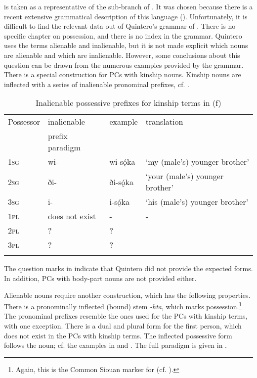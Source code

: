\documentclass[output=paper]{LSP/langsci}
\begin{document}
 is taken as a representative of the  sub-branch of . It was chosen because there is a recent extensive grammatical description of this language (\citealt{Quintero2004}). Unfortunately, it is difficult to find the relevant data out of Quintero's grammar of . There is no specific chapter on possession, and there is no index in the grammar. Quintero uses the terms alienable and inalienable, but it is not made explicit which nouns are alienable and which are inalienable. However, some conclusions about this question can be drawn from the numerous examples provided by the grammar.
There is a special construction for PCs with  kinship nouns. Kinship nouns are inflected with a series of inalienable pronominal prefixes, cf. .

\begin{table}
\caption{Inalienable possessive prefixes for kinship terms in  (\citealt[481]{Quintero2004}f)} \label{osageinalienable}
\begin{tabular}{ l l l l }
\lsptoprule
Possessor	 & inalienable & example & translation \\
& prefix paradigm & & \\
\midrule
\textsc{1sg} & wi-	& wi-sǫ́ka & `my (male's) younger brother' \\
 
\textsc{2sg} & ði- & ði-sǫ́ka & `your (male's) younger brother' \\
 
\textsc{3sg} & i- & i-sǫ́ka & `his (male's) younger brother' \\
 
\textsc{1pl} & does not exist &	- & - \\
 
\textsc{2pl} & ? & ? & \\
 
\textsc{3pl} & ? & ? & \\
\lspbottomrule
\end{tabular}
\end{table}
 
The question marks in  indicate that Quintero did not provide the expected forms. In addition, PCs with  body-part nouns are not provided either.

Alienable nouns require another construction, which has the following properties. There is a pronominally inflected (bound) stem \textit{-hta}, which marks possession.\footnote{Again, this is the Common Siouan marker for  (cf. \citealt{RankinEtAl2015AccessMay}).} The pronominal prefixes resemble the ones used for the PCs with  kinship terms, with one exception. There is a dual and plural form for the first person, which does not exist in the PCs with  kinship terms. The inflected possessive form follows the  noun; cf. the examples in  and . The full paradigm is given in .
\end{document}
